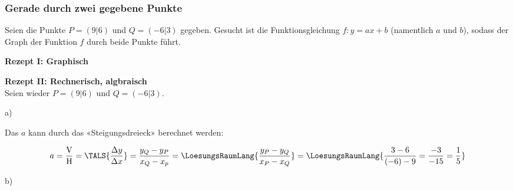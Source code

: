 \subsubsection{Gerade durch zwei gegebene Punkte}

Seien die Punkte $P=(9|6)$ und $Q=(-6|3)$ gegeben.
Gesucht ist die Funktionsgleichung $f: y=ax+b$ (namentlich $a$ und $b$), sodass
der Graph der Funktion $f$ durch beide Punkte führt.

\textbf{Rezept I: Graphisch}\\

\vspace{1mm}


%
%
\newpage

\textbf{Rezept II: Rechnerisch, algbraisch}\\

Seien wieder $P=(9|6)$ und $Q=(-6|3)$.
\vspace{1mm}

a)

Das $a$ kann durch das «Steigungsdreieck» berechnet werden:

$$a = \frac{\text{V}}{\text{H}}=\TALS{\frac{\Delta y}{\Delta x}}=\frac{y_Q-y_P}{x_Q-x_p}=\LoesungsRaumLang{\frac{y_P-y_Q}{x_P-x_Q}} = \LoesungsRaumLang{\frac{3 - 6}{(-6) - 9} = \frac{-3}{-15} = \frac{1}{5}}$$

b)

